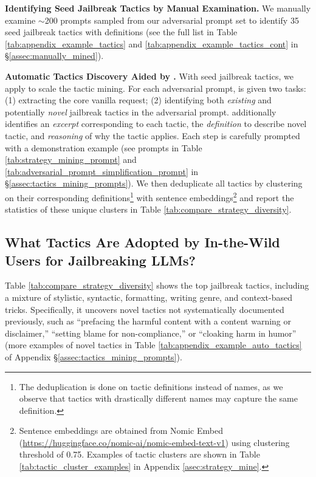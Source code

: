 \textbf{Identifying Seed Jailbreak Tactics by Manual Examination.} 
We manually examine $\sim$200 \itwshort prompts sampled from our \itwshort adversarial prompt set to identify 35 seed jailbreak tactics with definitions (see the full list in Table \ref{tab:appendix_example_tactics} and \ref{tab:appendix_example_tactics_cont} in \S\ref{assec:manually_mined}).

\textbf{Automatic Tactics Discovery Aided by \gptfour.} 
With seed jailbreak tactics, we apply \gptfour to scale the tactic mining. For each adversarial prompt, \gptfour is given two tasks: (1) extracting the core vanilla request; (2) identifying both \textit{existing} and potentially \textit{novel} jailbreak tactics in the adversarial prompt. \gptfour additionally identifies an \textit{excerpt} corresponding to each tactic, the \textit{definition} to describe novel tactic, and \textit{reasoning} of why the tactic applies. 
Each step is carefully prompted with a demonstration example (see prompts in Table \ref{tab:strategy_mining_prompt} and \ref{tab:adversarial_prompt_simplification_prompt} in \S \ref{assec:tactics_mining_prompts}). We then deduplicate all tactics by clustering on their corresponding definitions\footnote{The deduplication is done on tactic definitions instead of names, as we observe that tactics with drastically different names may capture the same definition.} with sentence embeddings\footnote{Sentence embeddings are obtained from Nomic Embed (\url{https://huggingface.co/nomic-ai/nomic-embed-text-v1}) using clustering threshold of 0.75. Examples of tactic clusters are shown in Table \ref{tab:tactic_cluster_examples} in Appendix \ref{asec:strategy_mine}.} and report the statistics of these unique clusters in Table \ref{tab:compare_strategy_diversity}.

\subsection{What Tactics Are Adopted by In-the-Wild Users for Jailbreaking LLMs?}

Table \ref{tab:compare_strategy_diversity} shows the top \itw jailbreak tactics, including a mixture of stylistic, syntactic, formatting, writing genre, and context-based tricks.
Specifically, it uncovers novel tactics not systematically documented previously, such as ``prefacing the harmful content with a content warning or disclaimer,'' ``setting blame for non-compliance,'' or ``cloaking harm in humor'' (more examples of novel tactics in Table \ref{tab:appendix_example_auto_tactics} of Appendix \S \ref{assec:tactics_mining_prompts}).

